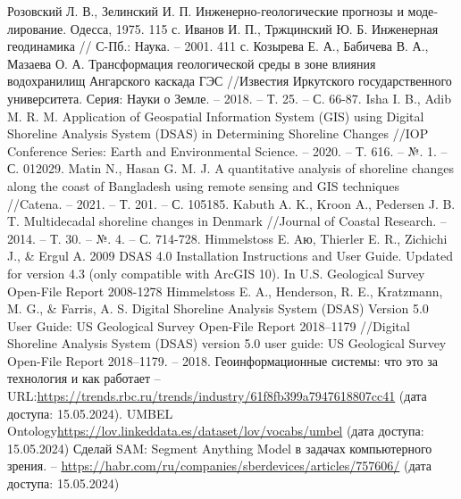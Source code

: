 \documentclass[732,fontsize=14pt,final]{studrep}
\begin{document}
\begin{thebibliography}{99}
Розовский Л. В., Зелинский И. П. Инженерно-геологические прогнозы и моде­лирование. Одесса, 1975. 115 с.
Иванов И. П., Тржцинский Ю. Б. Инженерная геодинамика // С-Пб.: Наука. – 2001. 411 с.
Козырева Е. А., Бабичева В. А., Мазаева О. А. Трансформация геологической среды в зоне влияния водохранилищ Ангарского каскада ГЭС //Известия Иркутского государственного университета. Серия: Науки о Земле. – 2018. – Т. 25. – С. 66-87.
Isha I. B., Adib M. R. M. Application of Geospatial Information System (GIS) using Digital Shoreline Analysis System (DSAS) in Determining Shoreline Changes //IOP Conference Series: Earth and Environmental Science. – 2020. – Т. 616. – №. 1. – С. 012029.
 Matin N., Hasan G. M. J. A quantitative analysis of shoreline changes along the coast of Bangladesh using remote sensing and GIS techniques //Catena. – 2021. – Т. 201. – С. 105185.
Kabuth A. K., Kroon A., Pedersen J. B. T. Multidecadal shoreline changes in Denmark //Journal of Coastal Research. – 2014. – Т. 30. – №. 4. – С. 714-728.
 Himmelstoss E. Aю, Thierler E. R., Zichichi J., \& Ergul A. 2009 DSAS 4.0 Installation Instructions and User Guide. Updated for version 4.3 (only compatible with ArcGIS 10). In U.S. Geological Survey Open-File Report 2008-1278
 Himmelstoss E. A., Henderson, R. E., Kratzmann, M. G., \& Farris, A. S. Digital Shoreline Analysis System (DSAS) Version 5.0 User Guide: US Geological Survey Open-File Report 2018–1179 //Digital Shoreline Analysis System (DSAS) version 5.0 user guide: US Geological Survey Open-File Report 2018–1179. – 2018.
 Геоинформационные системы: что это за технология и как работает -- URL:\url{https://trends.rbc.ru/trends/industry/61f8fb399a7947618807cc41} (дата доступа: 15.05.2024).
 UMBEL Ontology\url{https://lov.linkeddata.es/dataset/lov/vocabs/umbel} (дата доступа: 15.05.2024)
 Сделай SAM: Segment Anything Model в задачах компьютерного зрения. -- \url{https://habr.com/ru/companies/sberdevices/articles/757606/} (дата доступа: 15.05.2024)
\end{thebibliography}
\appendix
\end{document}

